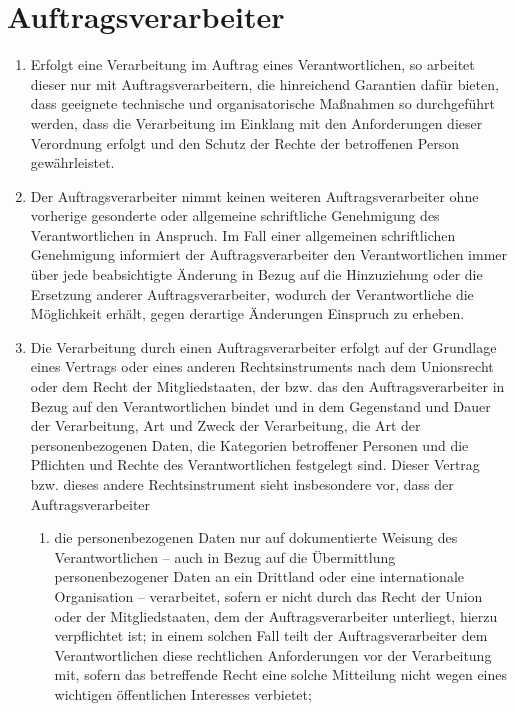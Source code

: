 \chapter{Auftragsverarbeiter}
\label{ch:28}


\begin{enumerate}

  \item Erfolgt eine Verarbeitung im Auftrag eines Verantwortlichen, so arbeitet dieser nur mit Auftragsverarbeitern,
   die hinreichend Garantien dafür bieten, dass geeignete technische und organisatorische Maßnahmen so durchgeführt
   werden, dass die Verarbeitung im Einklang mit den Anforderungen dieser Verordnung erfolgt und den Schutz der Rechte
   der betroffenen Person gewährleistet.
  \label{itm:28-1}

  \item Der Auftragsverarbeiter nimmt keinen weiteren Auftragsverarbeiter ohne vorherige gesonderte oder allgemeine
   schriftliche Genehmigung des Verantwortlichen in Anspruch. Im Fall einer allgemeinen schriftlichen Genehmigung
   informiert der Auftragsverarbeiter den Verantwortlichen immer über jede beabsichtigte Änderung in Bezug auf die
   Hinzuziehung oder die Ersetzung anderer Auftragsverarbeiter, wodurch der Verantwortliche die Möglichkeit erhält,
   gegen derartige Änderungen Einspruch zu erheben.
  \label{itm:28-2}

  \item Die Verarbeitung durch einen Auftragsverarbeiter erfolgt auf der Grundlage eines Vertrags oder eines anderen
   Rechtsinstruments nach dem Unionsrecht oder dem Recht der Mitgliedstaaten, der bzw. das den Auftragsverarbeiter in
   Bezug auf den Verantwortlichen bindet und in dem Gegenstand und Dauer der Verarbeitung, Art und Zweck der
   Verarbeitung, die Art der personenbezogenen Daten, die Kategorien betroffener Personen und die Pflichten und Rechte
   des Verantwortlichen festgelegt sind. Dieser Vertrag bzw. dieses andere Rechtsinstrument sieht insbesondere vor,
   dass der Auftragsverarbeiter
  \label{itm:28-3-1}

  \begin{enumerate}
  
    \item die personenbezogenen Daten nur auf dokumentierte Weisung des Verantwortlichen -- auch in Bezug auf die
     Übermittlung personenbezogener Daten an ein Drittland oder eine internationale Organisation -- verarbeitet, sofern
     er nicht durch das Recht der Union oder der Mitgliedstaaten, dem der Auftragsverarbeiter unterliegt, hierzu
     verpflichtet ist; in einem solchen Fall teilt der Auftragsverarbeiter dem Verantwortlichen diese rechtlichen
     Anforderungen vor der Verarbeitung mit, sofern das betreffende Recht eine solche Mitteilung nicht wegen eines
     wichtigen öffentlichen Interesses verbietet;
    \label{itm:28-3-1a}


\end{enumerate}
\end{enumerate}
